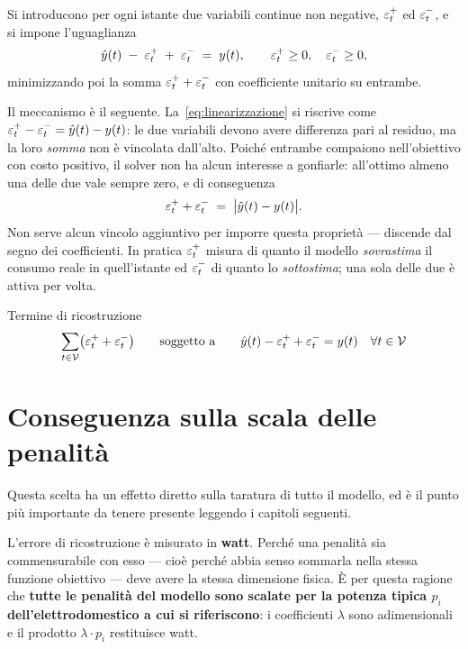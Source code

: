 Si introducono per ogni istante due variabili continue non negative, $\varepsilon^{+}_t$ ed $\varepsilon^{-}_t$, e si
impone l'uguaglianza
\begin{equation}
  \hat{y}(t) \;-\; \varepsilon^{+}_t \;+\; \varepsilon^{-}_t \;=\; y(t),
  \qquad \varepsilon^{+}_t \ge 0, \quad \varepsilon^{-}_t \ge 0 ,
  \label{eq:linearizzazione}
\end{equation}
minimizzando poi la somma $\varepsilon^{+}_t + \varepsilon^{-}_t$ con coefficiente unitario su entrambe.

Il meccanismo è il seguente. La~\eqref{eq:linearizzazione} si riscrive come
$\varepsilon^{+}_t - \varepsilon^{-}_t = \hat{y}(t) - y(t)$: le due variabili devono avere differenza pari al residuo, ma
la loro \emph{somma} non è vincolata dall'alto. Poiché entrambe compaiono nell'obiettivo con
costo positivo, il solver non ha alcun interesse a gonfiarle: all'ottimo almeno una delle due vale
sempre zero, e di conseguenza
\begin{equation}
  \varepsilon^{+}_t + \varepsilon^{-}_t \;=\; \bigl| \hat{y}(t) - y(t) \bigr| .
\end{equation}
Non serve alcun vincolo aggiuntivo per imporre questa proprietà --- discende dal segno dei
coefficienti. In pratica $\varepsilon^{+}_t$ misura di quanto il modello \emph{sovrastima} il consumo reale in
quell'istante ed $\varepsilon^{-}_t$ di quanto lo \emph{sottostima}; una sola delle due è attiva per volta.

\begin{modelbox}{Termine di ricostruzione}
\begin{equation*}
  \sum_{t \in \mathcal{V}} \bigl( \varepsilon^{+}_t + \varepsilon^{-}_t \bigr)
  \qquad\text{soggetto a}\qquad
  \hat{y}(t) - \varepsilon^{+}_t + \varepsilon^{-}_t = y(t) \quad \forall t \in \mathcal{V}
\end{equation*}
\end{modelbox}

\section{Conseguenza sulla scala delle penalità}

Questa scelta ha un effetto diretto sulla taratura di tutto il modello, ed è il punto più
importante da tenere presente leggendo i capitoli seguenti.

L'errore di ricostruzione è misurato in \textbf{watt}. Perché una penalità sia commensurabile con
esso --- cioè perché abbia senso sommarla nella stessa funzione obiettivo --- deve avere la stessa
dimensione fisica. È per questa ragione che \textbf{tutte le penalità del modello sono scalate per
la potenza tipica $p_i$ dell'elettrodomestico a cui si riferiscono}: i coefficienti $\lambda$ sono
adimensionali e il prodotto $\lambda \cdot p_i$ restituisce watt.

